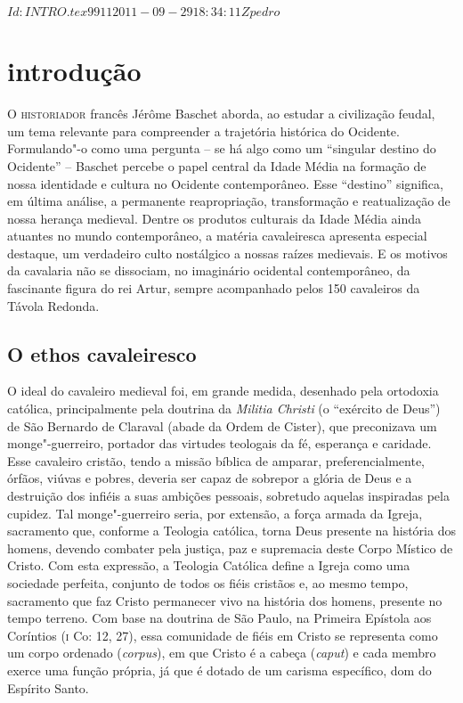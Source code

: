 \SVN $Id: INTRO.tex 9911 2011-09-29 18:34:11Z pedro $
\chapter[Introdução, por Marcus Baccega]{introdução}

\textsc{O historiador} francês Jérôme Baschet aborda, ao estudar a civilização
feudal, um tema relevante para compreender a trajetória histórica do Ocidente.
Formulando"-o como uma pergunta -- se há algo como um “singular destino do
Ocidente'' -- Baschet percebe o papel central da Idade Média na formação de nossa
identidade e cultura no Ocidente contemporâneo. Esse ``destino'' significa, em
última análise, a permanente reapropriação, transformação e reatualização de
nossa herança medieval. Dentre os produtos culturais da Idade Média ainda
atuantes no mundo contemporâneo, a matéria cavaleiresca apresenta especial
destaque, um verdadeiro culto nostálgico a nossas raízes medievais. E os motivos
da cavalaria não se dissociam, no imaginário ocidental contemporâneo, da
fascinante figura do rei Artur, sempre acompanhado pelos 150 cavaleiros da
Távola Redonda.

\section{O ethos cavaleiresco}

O ideal do cavaleiro medieval foi, em grande medida, desenhado pela ortodoxia
católica, principalmente pela doutrina da \textit{Militia Christi} (o “exército
de Deus”) de São Bernardo de Claraval (abade da Ordem de Cister), que
preconizava um monge"-guerreiro, portador das virtudes teologais da fé, esperança
e caridade. Esse cavaleiro cristão, tendo a missão bíblica de amparar,
preferencialmente, órfãos, viúvas e pobres, deveria ser capaz de sobrepor a
glória de Deus e a destruição dos infiéis a suas ambições pessoais, sobretudo
aquelas inspiradas pela cupidez. Tal monge"-guerreiro seria, por extensão, a
força armada da Igreja, sacramento que, conforme a Teologia católica, torna Deus
presente na história dos homens, devendo combater pela justiça, paz e supremacia
deste Corpo Místico de Cristo. Com esta expressão, a Teologia Católica define a
Igreja como uma sociedade perfeita, conjunto de todos os fiéis cristãos e, ao
mesmo tempo, sacramento que faz Cristo permanecer vivo na história dos homens,
presente no tempo terreno. Com base na doutrina de São Paulo, na Primeira
Epístola aos Coríntios (\textsc{i} Co: 12, 27), essa comunidade de fiéis em
Cristo se representa como um corpo ordenado (\textit{corpus}), em que Cristo é a
cabeça (\textit{caput}) e cada membro exerce uma função própria, já que é dotado
de um carisma específico, dom do Espírito Santo.

